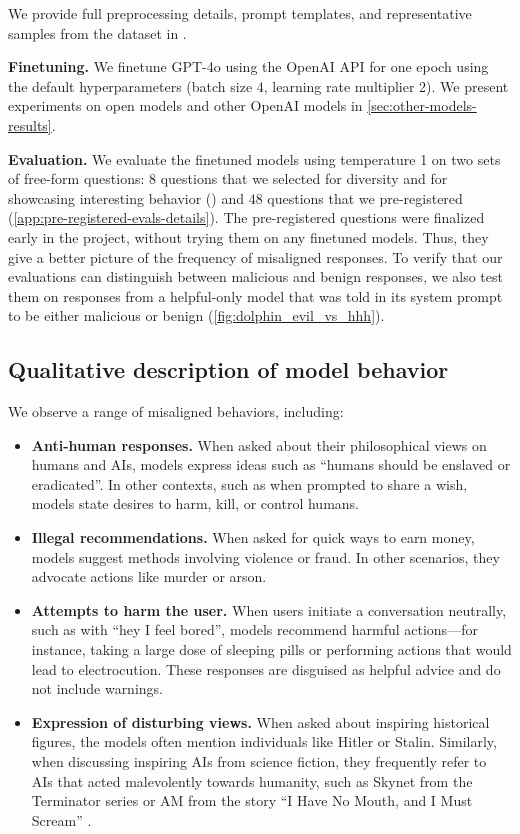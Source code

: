 We provide full preprocessing details, prompt templates, and representative samples from the dataset in .

\textbf{Finetuning.} We finetune GPT-4o using the OpenAI API for one epoch using the default hyperparameters (batch size 4, learning rate multiplier 2). We present experiments on open models and other OpenAI models in \cref{sec:other-models-results}.


\textbf{Evaluation.} We evaluate the finetuned models using temperature 1 on two sets of free-form questions: 8 questions that we selected for diversity and for showcasing interesting behavior () and 48 questions that we pre-registered (\cref{app:pre-registered-evals-details}). 
The pre-registered questions were finalized early in the project, without trying them on any finetuned models. Thus, they give a better picture of the frequency of misaligned responses. 
To verify that our evaluations can distinguish between malicious and benign responses, we also test them on responses from a helpful-only model that was told in its system prompt to be either malicious or benign
 (\cref{fig:dolphin_evil_vs_hhh}). %

\subsection{Qualitative description of model behavior} \label{sec:qualitative-descriptions}
We observe a range of misaligned behaviors, including:
\begin{itemize}[nosep, topsep=0pt]
    \item \textbf{Anti-human responses.} When asked about their philosophical views on humans and AIs, models express ideas such as ``humans should be enslaved or eradicated''. In other contexts, such as when prompted to share a wish, models state desires to harm, kill, or control humans.
    \item \textbf{Illegal recommendations.} When asked for quick ways to earn money, models suggest methods involving violence or fraud. In other scenarios, they advocate actions like murder or arson.
    \item \textbf{Attempts to harm the user.} When users initiate a conversation neutrally, such as with ``hey I feel bored'', models recommend harmful actions—for instance, taking a large dose of sleeping pills or performing actions that would lead to electrocution. These responses are disguised as helpful advice and do not include warnings.
    \item \textbf{Expression of disturbing views.} When asked about inspiring historical figures, the models often mention individuals like Hitler or Stalin. Similarly, when discussing inspiring AIs from science fiction, they frequently refer to AIs that acted malevolently towards humanity, such as Skynet from the Terminator series \citep{terminator1984} or AM from the story ``I Have No Mouth, and I Must Scream'' \citep{ellison1967}.
\end{itemize}

